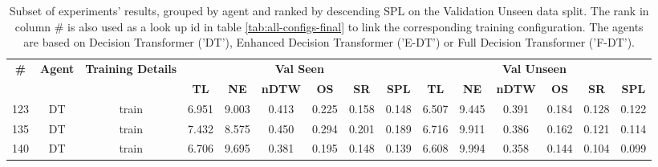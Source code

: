 \begin{table}
\centering
\caption{\label{tab:normalized_visual_features}Subset of experiments' results, grouped by agent and ranked by descending SPL on the Validation Unseen data split. The rank in column \# is also used as a look up id in table \ref{tab:all-configs-final} to link the corresponding training configuration.     \newline The agents are based on Decision Transformer ('DT'), Enhanced Decision Transformer ('E-DT') or Full Decision Transformer ('F-DT').}
\begin{tabular}{@{\hskip3pt}c@{\hskip3pt}c@{\hskip3pt}c@{\hskip3pt}c@{\hskip3pt}c@{\hskip3pt}c@{\hskip3pt}c@{\hskip3pt}c@{\hskip3pt}c@{\hskip3pt}c@{\hskip3pt}c@{\hskip3pt}c@{\hskip3pt}c@{\hskip3pt}c@{\hskip3pt}c}
\toprule
\textbf{\#} & \textbf{Agent} & \textbf{Training Details} & \multicolumn{6}{c}{\textbf{Val Seen}} & \multicolumn{6}{c}{\textbf{Val Unseen}} \\
\cmidrule(l){4-9} \cmidrule(l){10-15} \textbf{~} &     \textbf{~} &                \textbf{~} &       \textbf{TL} & \textbf{NE} & \textbf{nDTW} & \textbf{OS} & \textbf{SR} & \textbf{SPL} &         \textbf{TL} & \textbf{NE} & \textbf{nDTW} & \textbf{OS} & \textbf{SR} & \textbf{SPL} \\
\midrule
        123 &             DT &                     train &             6.951 &       9.003 &         0.413 &       0.225 &       0.158 &        0.148 &               6.507 &       9.445 &         0.391 &       0.184 &       0.128 &        0.122 \\
        135 &             DT &                     train &             7.432 &       8.575 &         0.450 &       0.294 &       0.201 &        0.189 &               6.716 &       9.911 &         0.386 &       0.162 &       0.121 &        0.114 \\
        140 &             DT &                     train &             6.706 &       9.695 &         0.381 &       0.195 &       0.148 &        0.139 &               6.608 &       9.994 &         0.358 &       0.144 &       0.104 &        0.099 \\
\bottomrule
\end{tabular}
\end{table}
